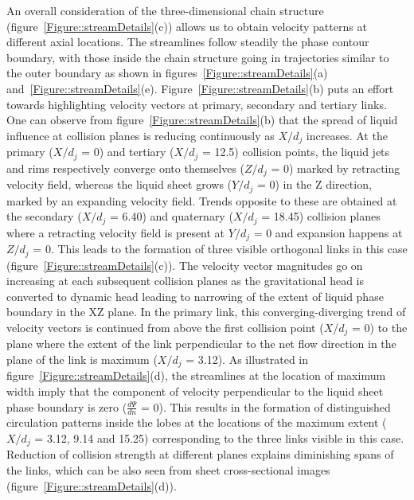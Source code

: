 An overall consideration of the three-dimensional chain structure (figure~\ref{Figure::streamDetails}(c)) allows us to obtain velocity patterns at different axial locations. The streamlines follow steadily the phase contour boundary, with those inside the chain structure going in trajectories similar to the outer boundary as shown in figures~\ref{Figure::streamDetails}(a) and~\ref{Figure::streamDetails}(e). Figure~\ref{Figure::streamDetails}(b) puts an effort towards highlighting velocity vectors at primary, secondary and tertiary links. One can observe from figure~\ref{Figure::streamDetails}(b) that the spread of liquid influence at collision planes is reducing continuously as $X/d_j$ increases.  At the primary ($X/d_j$ = 0) and tertiary ($X/d_j$ = 12.5) collision points, the liquid jets and rims respectively converge onto themselves ($Z/d_j$ = 0) marked by retracting velocity field, whereas the liquid sheet grows ($Y/d_j$ = 0) in the Z direction, marked by an expanding velocity field. Trends opposite to these are obtained at the secondary ($X/d_j$ = 6.40) and quaternary ($X/d_j$ = 18.45) collision planes where a retracting velocity field is present at $Y/d_j$ = 0 and expansion happens at $Z/d_j$ = 0. This leads to the formation of three visible orthogonal links in this case (figure~\ref{Figure::streamDetails}(c)). The velocity vector magnitudes go on increasing at each subsequent collision planes as the gravitational head is converted to dynamic head leading to narrowing of the extent of liquid phase boundary in the XZ plane. In the primary link, this converging-diverging trend of velocity vectors is continued from above the first collision point ($X/d_j$ = 0) to the plane where the extent of the link perpendicular to the net flow direction in the plane of the link is maximum ($X/d_j$ = 3.12). As illustrated in figure~\ref{Figure::streamDetails}(d), the streamlines at the location of maximum width imply that the component of velocity perpendicular to the liquid sheet phase boundary is zero ($\frac{d\Psi}{dn}$ = 0). This results in the formation of distinguished circulation patterns inside the lobes at the locations of the maximum extent ($X/d_j$ = 3.12, 9.14 and 15.25) corresponding to the three links visible in this case. Reduction of collision strength at different planes explains diminishing spans of the links, which can be also seen from sheet cross-sectional images (figure~\ref{Figure::streamDetails}(d)).\\
